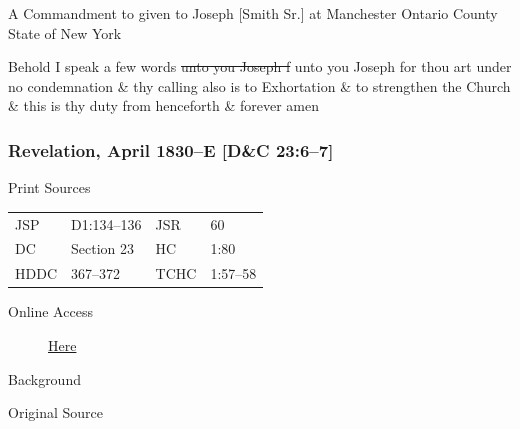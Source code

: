 				A Commandment to given to Joseph [Smith Sr.] at Manchester Ontario County State of New York
				
				Behold I speak a few words \sout{unto you Joseph f} unto you Joseph for thou art under no condemnation \& thy calling also is to Exhortation \& to strengthen the Church \& this is thy duty from henceforth \& forever amen
				
		\subsubsection{Revelation, April 1830--E [D\&C 23:6--7]}
			\label{EMS-1830-JS-APR-1830-E}
		
			\begin{description}
				\item[Print Sources]
			\end{description}

				\begin{tabular}{p{0.5in}p{1in}p{0.5in}p{1in}}
				JSP	 	& D1:134--136	& JSR 		& 60	 \\
				DC	 	& Section 23	& HC 		& 1:80	 \\
				HDDC 	& 367--372		& TCHC 		& 1:57--58 \\
				\end{tabular}
			
			\begin{description}
				\item[Online Access] \href{https://www.josephsmithpapers.org/paper-summary/revelation-april-1830-e-dc-236-7/1}{Here}
			\end{description}
			
			\begin{description}
				\item[Background]
			\end{description}
			
			
			\begin{description}
				\item[Original Source]
			\end{description}
			
